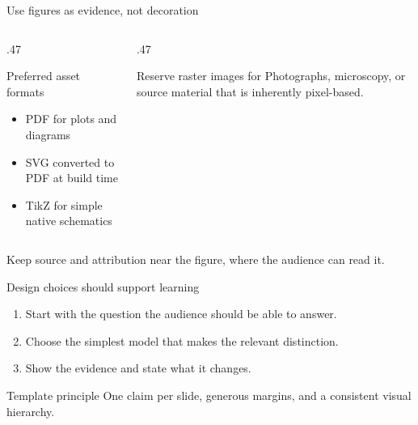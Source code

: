 \documentclass[aspectratio=169,10pt]{beamer}
\begin{document}
\begin{frame}{Use figures as evidence, not decoration}
  \begin{columns}[T,onlytextwidth]
    \begin{column}{.47\textwidth}
      \begin{block}{Preferred asset formats}
        \begin{itemize}
          \item PDF for plots and diagrams
          \item SVG converted to PDF at build time
          \item TikZ for simple native schematics
        \end{itemize}
      \end{block}
    \end{column}
    \begin{column}{.47\textwidth}
      \begin{alertblock}{Reserve raster images for}
        Photographs, microscopy, or source material that is inherently pixel-based.
      \end{alertblock}
    \end{column}
  \end{columns}

  \vfill
  {\small\color{NMAMidGray}%
    Keep source and attribution near the figure, where the audience can read it.}
\end{frame}

\begin{frame}{Design choices should support learning}
  \begin{enumerate}
    \item Start with the question the audience should be able to answer.
    \item Choose the simplest model that makes the relevant distinction.
    \item Show the evidence and state what it changes.
  \end{enumerate}

  \vspace{.5em}
  \begin{block}{Template principle}
    One claim per slide, generous margins, and a consistent visual hierarchy.
  \end{block}
\end{frame}

\end{document}
